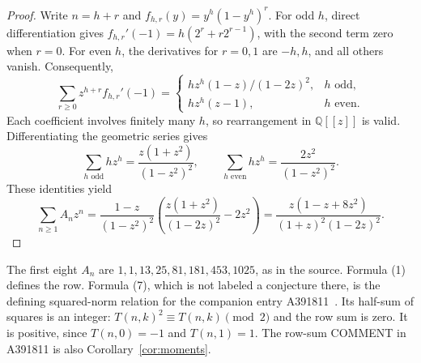 \documentclass[11pt]{article}
\newcommand{\Q}{\mathbb Q}
\begin{document}
\begin{proof}
Write $n=h+r$ and $f_{h,r}(y)=y^h(1-y^h)^r$.
For odd $h$, direct differentiation gives
$f_{h,r}'(-1)=h(2^r+r2^{r-1})$, with the second term zero when $r=0$.
For even $h$, the derivatives for $r=0,1$ are $-h,h$, and all others vanish.
Consequently,
\[
 \sum_{r\geq0}z^{h+r}f_{h,r}'(-1)=
 \begin{cases}
 hz^h(1-z)/(1-2z)^2,&h\text{ odd},\\
 hz^h(z-1),&h\text{ even}.
 \end{cases}
\]
Each coefficient involves finitely many $h$, so rearrangement in $\Q[[z]]$
is valid. Differentiating the geometric series gives
\[
 \sum_{h\text{ odd}}hz^h=\frac{z(1+z^2)}{(1-z^2)^2},\qquad
 \sum_{h\text{ even}}hz^h=\frac{2z^2}{(1-z^2)^2}.
\]
These identities yield
\[
 \sum_{n\geq1}A_nz^n
 =\frac{1-z}{(1-z^2)^2}
   \left(\frac{z(1+z^2)}{(1-2z)^2}-2z^2\right)
 =\frac{z(1-z+8z^2)}{(1+z)^2(1-2z)^2}.
\]
\end{proof}

The first eight $A_n$ are $1,1,13,25,81,181,453,1025$, as in the source.
Formula (1) defines the row. Formula (7), which is not labeled a conjecture
there, is the defining squared-norm relation for the companion entry
A391811~\cite{norm}. Its half-sum of squares is an integer:
$T(n,k)^2\equiv T(n,k)\pmod2$ and the row sum is zero.
It is positive, since $T(n,0)=-1$ and $T(n,1)=1$.
The row-sum COMMENT in A391811 is also Corollary~\ref{cor:moments}.
\end{document}
